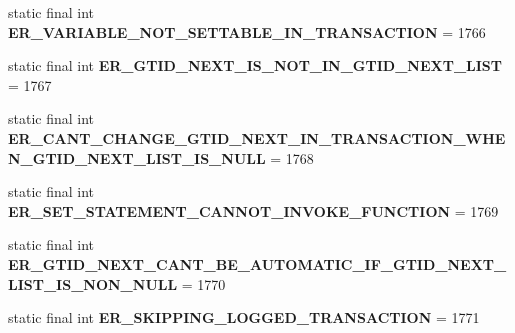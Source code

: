 \begin{DoxyCompactItemize}
\mbox{\label{classcom_1_1mysql_1_1cj_1_1exceptions_1_1_mysql_error_numbers_a324ed1d0baa472f97099ff99330559e8}} 
static final int {\bfseries E\+R\+\_\+\+V\+A\+R\+I\+A\+B\+L\+E\+\_\+\+N\+O\+T\+\_\+\+S\+E\+T\+T\+A\+B\+L\+E\+\_\+\+I\+N\+\_\+\+T\+R\+A\+N\+S\+A\+C\+T\+I\+ON} = 1766
\item 
\mbox{\label{classcom_1_1mysql_1_1cj_1_1exceptions_1_1_mysql_error_numbers_acf796e5eccf3211026d9100862e07612}} 
static final int {\bfseries E\+R\+\_\+\+G\+T\+I\+D\+\_\+\+N\+E\+X\+T\+\_\+\+I\+S\+\_\+\+N\+O\+T\+\_\+\+I\+N\+\_\+\+G\+T\+I\+D\+\_\+\+N\+E\+X\+T\+\_\+\+L\+I\+ST} = 1767
\item 
\mbox{\label{classcom_1_1mysql_1_1cj_1_1exceptions_1_1_mysql_error_numbers_a71c2913d8152a3ac727e6b4860aae4c3}} 
static final int {\bfseries E\+R\+\_\+\+C\+A\+N\+T\+\_\+\+C\+H\+A\+N\+G\+E\+\_\+\+G\+T\+I\+D\+\_\+\+N\+E\+X\+T\+\_\+\+I\+N\+\_\+\+T\+R\+A\+N\+S\+A\+C\+T\+I\+O\+N\+\_\+\+W\+H\+E\+N\+\_\+\+G\+T\+I\+D\+\_\+\+N\+E\+X\+T\+\_\+\+L\+I\+S\+T\+\_\+\+I\+S\+\_\+\+N\+U\+LL} = 1768
\item 
\mbox{\label{classcom_1_1mysql_1_1cj_1_1exceptions_1_1_mysql_error_numbers_abbaf603664476961f70b75b5c114a586}} 
static final int {\bfseries E\+R\+\_\+\+S\+E\+T\+\_\+\+S\+T\+A\+T\+E\+M\+E\+N\+T\+\_\+\+C\+A\+N\+N\+O\+T\+\_\+\+I\+N\+V\+O\+K\+E\+\_\+\+F\+U\+N\+C\+T\+I\+ON} = 1769
\item 
\mbox{\label{classcom_1_1mysql_1_1cj_1_1exceptions_1_1_mysql_error_numbers_aeb8bc7f7ecc3efe0cb980fde3a20a72c}} 
static final int {\bfseries E\+R\+\_\+\+G\+T\+I\+D\+\_\+\+N\+E\+X\+T\+\_\+\+C\+A\+N\+T\+\_\+\+B\+E\+\_\+\+A\+U\+T\+O\+M\+A\+T\+I\+C\+\_\+\+I\+F\+\_\+\+G\+T\+I\+D\+\_\+\+N\+E\+X\+T\+\_\+\+L\+I\+S\+T\+\_\+\+I\+S\+\_\+\+N\+O\+N\+\_\+\+N\+U\+LL} = 1770
\item 
\mbox{\label{classcom_1_1mysql_1_1cj_1_1exceptions_1_1_mysql_error_numbers_a879a5c5f4108ea504ff8227d81bd3561}} 
static final int {\bfseries E\+R\+\_\+\+S\+K\+I\+P\+P\+I\+N\+G\+\_\+\+L\+O\+G\+G\+E\+D\+\_\+\+T\+R\+A\+N\+S\+A\+C\+T\+I\+ON} = 1771

\end{DoxyCompactItemize}
